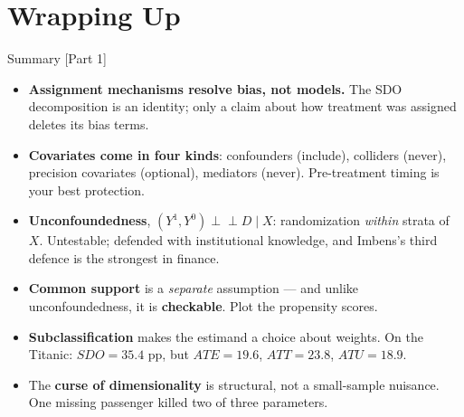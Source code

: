 \documentclass[
  11pt,
  ignorenonframetext,
  aspectratio=169,
]{beamer}
\providecommand{\tightlist}{%
  \setlength{\itemsep}{0pt}\setlength{\parskip}{0pt}}
\newcommand{\indep}{\perp\!\!\!\perp}
\begin{document}
\section{Wrapping Up}\label{wrapping-up}

\begin{frame}{Summary {[}Part 1{]}}
\protect{}\label{summary-part-1}
\begin{itemize}
\tightlist
\item
  \textbf{Assignment mechanisms resolve bias, not models.} The SDO
  decomposition is an identity; only a claim about how treatment was
  assigned deletes its bias terms.
\item
  \textbf{Covariates come in four kinds}: confounders (include),
  colliders (never), precision covariates (optional), mediators (never).
  Pre-treatment timing is your best protection.
\item
  \textbf{Unconfoundedness}, \((Y^1,Y^0) \indep D \mid X\):
  randomization \emph{within} strata of \(X\). Untestable; defended with
  institutional knowledge, and Imbens's third defence is the strongest
  in finance.
\item
  \textbf{Common support} is a \emph{separate} assumption --- and unlike
  unconfoundedness, it is \textbf{checkable}. Plot the propensity
  scores.
\item
  \textbf{Subclassification} makes the estimand a choice about weights.
  On the Titanic: \(SDO = 35.4\) pp, but \(ATE = 19.6\), \(ATT = 23.8\),
  \(ATU = 18.9\).
\item
  The \textbf{curse of dimensionality} is structural, not a small-sample
  nuisance. One missing passenger killed two of three parameters.
\end{itemize}
\end{frame}
\end{document}
